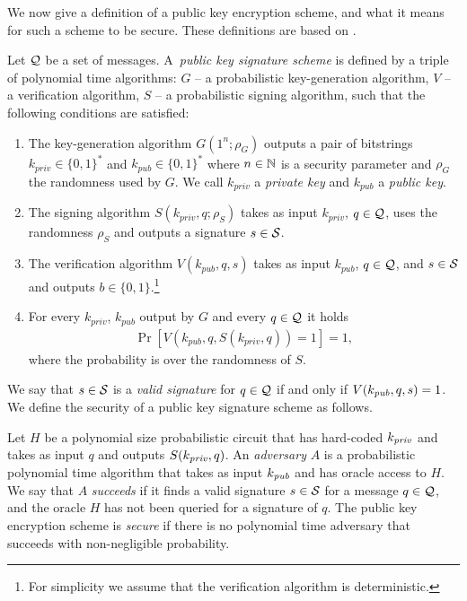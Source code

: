 We now give a definition of a public key encryption scheme, and what it means for such a scheme to be secure.
These definitions are based on \cite{Goldreich:2004:FCV:975541}.

\begin{definition}
Let $\mathcal{Q}$ be a set of messages. A~\textit{public key signature scheme} is defined by a triple of polynomial time algorithms:
$G$ -- a probabilistic key-generation algorithm,
$V$ -- a verification algorithm,
$S$ -- a probabilistic signing algorithm,
such that the following conditions are satisfied:
\begin{enumerate}[-]
  \item The key-generation algorithm $G(1^n; \rho_G)$ outputs a pair of bitstrings $k_{\mathit{priv}} \in \{0,1\}^{*}$ and $k_{\mathit{pub}} \in \{0,1\}^{*}$ where $n \in \mathbb{N}$ is a security
    parameter and $\rho_G$ the randomness used by $G$. We call $k_{\mathit{priv}}$ a \textit{private key} and $k_{\mathit{pub}}$ a \textit{public key}.
  \item The signing algorithm $S(k_{\mathit{priv}}, q; \rho_S)$ takes as input $k_{\mathit{priv}}$, $q \in \mathcal{Q}$, uses the randomness $\rho_S$ and outputs a signature $s \in \mathcal{S}$.
  \item The verification algorithm $V(k_{\mathit{pub}}, q, s)$ takes as input $k_{\mathit{pub}}$, $q \in \mathcal{Q}$, and $s \in \mathcal{S}$ and outputs $b \in \{0,1\}$.\footnote{For simplicity we assume that the verification
algorithm is deterministic.}
  \item For every $k_{\mathit{priv}}$, $k_{\mathit{pub}}$ output by $G$ and every $q \in \mathcal{Q}$ it holds
    \begin{align*}
      \Pr[V(k_{\mathit{pub}}, q, S(k_{\mathit{priv}}, q)) = 1] = 1,
    \end{align*}
    where the probability is over the randomness of $S$.
\end{enumerate}
\end{definition}
We say that $s \in \mathcal{S}$ is a \textit{valid signature} for $q \in \mathcal{Q}$ if and only if $V(k_{\operatorname{\mathit{pub}}}, q, s) = 1$.
We define the security of a public key signature scheme as follows.
%
\begin{definition}
  \label{def:sec_sig}
Let $H$ be a polynomial size probabilistic circuit that has hard-coded $k_{\operatorname{\mathit{priv}}}$ and takes as input $q$ and outputs $S(k_{\operatorname{\mathit{priv}}}, q)$.
An \textit{adversary} $A$ is a probabilistic polynomial time algorithm that takes as input $k_{\operatorname{\mathit{pub}}}$ and has oracle access to $H$.
We say that $A$ \textit{succeeds} if it finds a valid signature $s \in \mathcal{S}$ for a message $q \in \mathcal{Q}$, and the oracle $H$ has not been queried for a signature of $q$.
The public key encryption scheme is \textit{secure} if there is no polynomial time adversary that succeeds with non-negligible probability.
\end{definition}
